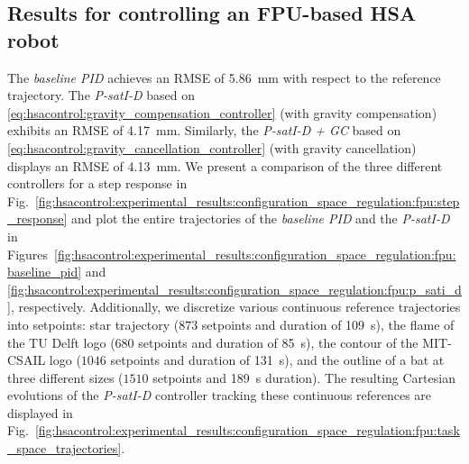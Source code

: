 \subsection{Results for controlling an FPU-based HSA robot}
The \emph{baseline PID} achieves an \gls{RMSE} of \SI{5.86}{mm} with respect to the reference trajectory. The \emph{P-satI-D} based on \eqref{eq:hsacontrol:gravity_compensation_controller} (with gravity compensation) exhibits an RMSE of \SI{4.17}{mm}. Similarly, the \emph{P-satI-D + GC} based on \eqref{eq:hsacontrol:gravity_cancellation_controller} (with gravity cancellation) displays an RMSE of \SI{4.13}{mm}.
We present a comparison of the three different controllers for a step response in Fig.~\ref{fig:hsacontrol:experimental_results:configuration_space_regulation:fpu:step_response} and plot the entire trajectories of the \emph{baseline PID} and the \emph{P-satI-D} in Figures~\ref{fig:hsacontrol:experimental_results:configuration_space_regulation:fpu:baseline_pid} and \ref{fig:hsacontrol:experimental_results:configuration_space_regulation:fpu:p_sati_d}, respectively.
Additionally, we discretize various continuous reference trajectories into setpoints: 
star trajectory ($873$ setpoints and duration of \SI{109}{s}), the flame of the TU Delft logo ($680$ setpoints and duration of \SI{85}{s}), the contour of the MIT-CSAIL logo ($1046$ setpoints and duration of \SI{131}{s}), and the outline of a bat at three different sizes ($1510$ setpoints and \SI{189}{s} duration).
The resulting Cartesian evolutions of the \emph{P-satI-D} controller tracking these continuous references are displayed in Fig.~\ref{fig:hsacontrol:experimental_results:configuration_space_regulation:fpu:task_space_trajectories}.

